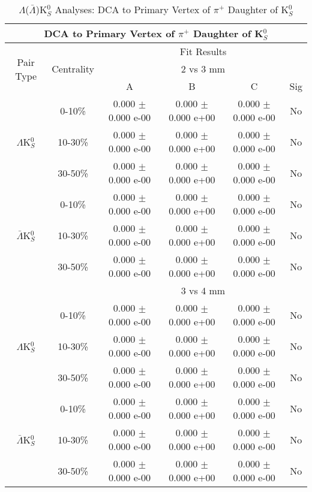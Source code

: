 \documentclass[../AnalysisNoteJBuxton.tex]{subfiles}
\begin{document}
\begin{table}
 \centering
 \begin{tabular}{|c|c|c|c|c|c|}
  \multicolumn{6}{c}{DCA to Primary Vertex of $\pi^{+}$ Daughter of K$^{0}_{S}$} \\
  \hline
  \multirow{3}{*}{Pair Type} & \multirow{3}{*}{Centrality} & \multicolumn{4}{c|}{Fit Results} \\
  \cline{3-6}
   & & \multicolumn{4}{c|}{2 vs 3 mm} \\
  \cline{3-6}
   & & A & B & C & Sig \\
  \hline  
  \multirow{3}{*}{$\Lambda$K$^{0}_{S}$}
   &  0-10\% & 0.000 $\pm$ 0.000 e-00 & 0.000 $\pm$ 0.000 e+00 & 0.000 $\pm$ 0.000 e-00 & No \\
   & 10-30\% & 0.000 $\pm$ 0.000 e-00 & 0.000 $\pm$ 0.000 e+00 & 0.000 $\pm$ 0.000 e-00 & No \\
   & 30-50\% & 0.000 $\pm$ 0.000 e-00 & 0.000 $\pm$ 0.000 e+00 & 0.000 $\pm$ 0.000 e-00 & No \\
  \hline
  \multirow{3}{*}{$\bar{\Lambda}$K$^{0}_{S}$}  
   &  0-10\% & 0.000 $\pm$ 0.000 e-00 & 0.000 $\pm$ 0.000 e+00 & 0.000 $\pm$ 0.000 e-00 & No \\
   & 10-30\% & 0.000 $\pm$ 0.000 e-00 & 0.000 $\pm$ 0.000 e+00 & 0.000 $\pm$ 0.000 e-00 & No \\
   & 30-50\% & 0.000 $\pm$ 0.000 e-00 & 0.000 $\pm$ 0.000 e+00 & 0.000 $\pm$ 0.000 e-00 & No \\
  \hline 
  \multicolumn{2}{|c|}{} & \multicolumn{4}{c|}{3 vs 4 mm} \\
  \hline  
  \multirow{3}{*}{$\Lambda$K$^{0}_{S}$}   
   &  0-10\% & 0.000 $\pm$ 0.000 e-00 & 0.000 $\pm$ 0.000 e+00 & 0.000 $\pm$ 0.000 e-00 & No \\
   & 10-30\% & 0.000 $\pm$ 0.000 e-00 & 0.000 $\pm$ 0.000 e+00 & 0.000 $\pm$ 0.000 e-00 & No \\
   & 30-50\% & 0.000 $\pm$ 0.000 e-00 & 0.000 $\pm$ 0.000 e+00 & 0.000 $\pm$ 0.000 e-00 & No \\
  \hline  
  \multirow{3}{*}{$\bar{\Lambda}$K$^{0}_{S}$}
   &  0-10\% & 0.000 $\pm$ 0.000 e-00 & 0.000 $\pm$ 0.000 e+00 & 0.000 $\pm$ 0.000 e-00 & No \\
   & 10-30\% & 0.000 $\pm$ 0.000 e-00 & 0.000 $\pm$ 0.000 e+00 & 0.000 $\pm$ 0.000 e-00 & No \\
   & 30-50\% & 0.000 $\pm$ 0.000 e-00 & 0.000 $\pm$ 0.000 e+00 & 0.000 $\pm$ 0.000 e-00 & No \\
  \hline
 \end{tabular}
 \caption{$\Lambda$($\bar{\Lambda}$)K$^{0}_{S}$ Analyses: DCA to Primary Vertex of $\pi^{+}$ Daughter of K$^{0}_{S}$}
 \label{tab:DcaToPrimVertexPosPionDaughtOfK0LamK0Full}
\end{table}
\end{document}
